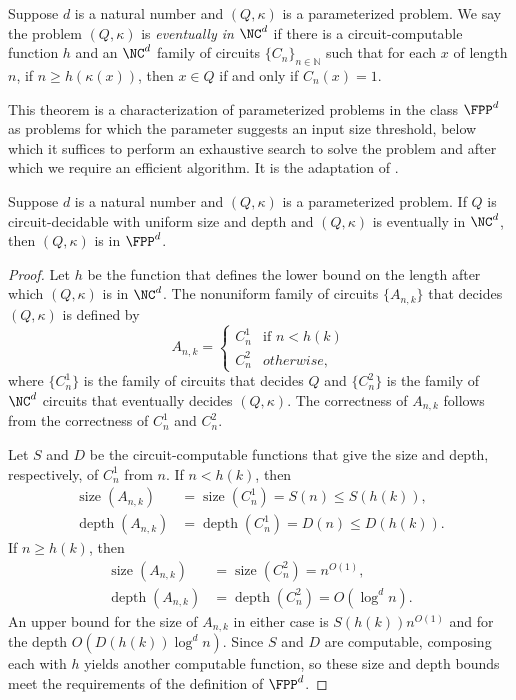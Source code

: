 \documentclass{article}
\DeclareMathOperator{\depth}{depth}
\DeclareMathOperator{\size}{size}
\begin{document}
\begin{definition}\label{def:eventually}
  Suppose $d$ is a natural number and $(Q, \kappa)$ is a parameterized problem.
  We say the problem $(Q, \kappa)$ is \emph{eventually in $\NC^d$} if there is a circuit-computable function $h$ and an $\NC^d$ family of circuits $\{C_n\}_{n \in \mathbb{N}}$ such that for each $x$ of length $n$, if $n \geq h(\kappa(x))$, then $x \in Q$ if and only if $C_n(x) = 1$.
\end{definition}

This theorem is a characterization of parameterized problems in the class $\FPP^d$ as problems for which the parameter suggests an input size threshold, below which it suffices to perform an exhaustive search to solve the problem and after which we require an efficient algorithm.
It is the adaptation of \autocite[Theorem~1.37]{fg06}.

\begin{theorem}\label{thm:eventually}
  Suppose $d$ is a natural number and $(Q, \kappa)$ is a parameterized problem.
  If $Q$ is circuit-decidable with uniform size and depth and $(Q, \kappa)$ is eventually in $\NC^d$, then $(Q, \kappa)$ is in $\FPP^d$.
\end{theorem}
\begin{proof}
  Let $h$ be the function that defines the lower bound on the length after which $(Q, \kappa)$ is in $\NC^d$.
  The nonuniform family of circuits $\{A_{n, k}\}$ that decides $(Q, \kappa)$ is defined by
  \[
  A_{n, k} =
  \begin{cases}
    C^1_n & \text{if } n < h(k) \\
    C^2_n & otherwise,
  \end{cases}
  \]
  where $\{C^1_n\}$ is the family of circuits that decides $Q$ and $\{C^2_n\}$ is the family of $\NC^d$ circuits that eventually decides $(Q, \kappa)$.
  The correctness of $A_{n, k}$ follows from the correctness of $C^1_n$ and $C^2_n$.

  Let $S$ and $D$ be the circuit-computable functions that give the size and depth, respectively, of $C^1_n$ from $n$.
  If $n < h(k)$, then
  \begin{align*}
    \size(A_{n, k}) & = \size(C^1_n) = S(n) \leq S(h(k)), \\
    \depth(A_{n, k}) & = \depth(C^1_n) = D(n) \leq D(h(k)).
  \end{align*}
  If $n \geq h(k)$, then
  \begin{align*}
    \size(A_{n, k}) & = \size(C^2_n) = n^{O(1)}, \\
    \depth(A_{n, k}) & = \depth(C^2_n) = O(\log^d n).
  \end{align*}
  An upper bound for the size of $A_{n, k}$ in either case is $S(h(k)) n^{O(1)}$ and for the depth $O(D(h(k)) \log^d n)$.
  Since $S$ and $D$ are computable, composing each with $h$ yields another computable function, so these size and depth bounds meet the requirements of the definition of $\FPP^d$.
\end{proof}
\end{document}
